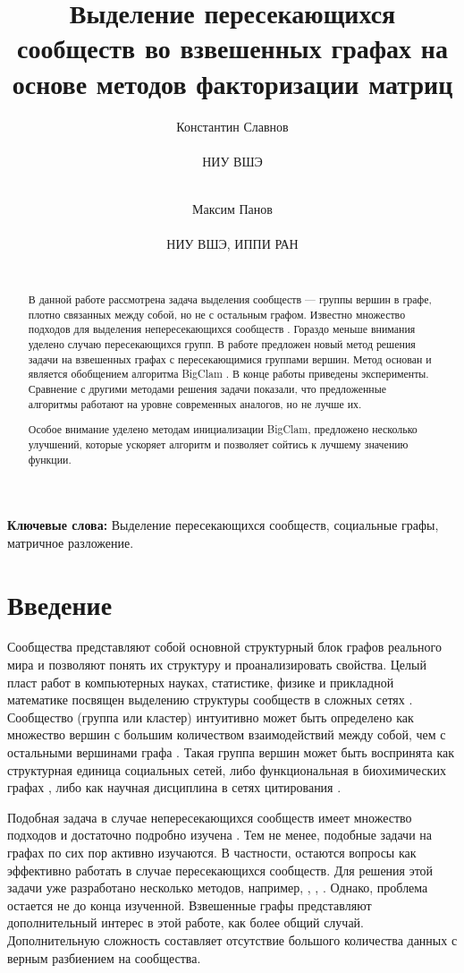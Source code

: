 \documentclass{ITaSconf}
\title{Выделение пересекающихся сообществ во взвешенных графах на основе методов факторизации матриц}
\author{
	Константин Славнов \\
	\begin{affiliation}
		НИУ ВШЭ
	\end{affiliation}\\
	\email{kaslavnov@edu.hse.ru}
	\and
	Максим Панов \\
	\begin{affiliation}
		НИУ ВШЭ, ИППИ РАН
	\end{affiliation}\\
	\email{panov.maxim@gmail.com}
}
\begin{document}
	\maketitle
	
	\begin{abstract}
		В данной работе рассмотрена задача выделения сообществ --- группы вершин в графе, плотно связанных между собой, но не с остальным графом. Известно множество подходов для выделения непересекающихся сообществ \cite{Fortunato10}. Гораздо меньше внимания уделено случаю пересекающихся групп. В работе предложен новый метод решения задачи на взвешенных графах с пересекающимися группами вершин. Метод основан и является обобщением алгоритма BigClam \cite{yang2013overlapping}.
		В конце работы приведены эксперименты. Сравнение с другими методами решения задачи показали, что предложенные алгоритмы работают на уровне современных аналогов, но не лучше их.
		
		Особое внимание уделено методам инициализации BigClam, предложено несколько улучшений, которые ускоряет алгоритм и позволяет сойтись к лучшему значению функции.
	\end{abstract}
	
	\textbf{Ключевые слова:} Выделение пересекающихся сообществ, социальные графы, матричное разложение.
	
	\section{Введение}
	
	Сообщества представляют собой основной структурный блок графов реального мира и позволяют понять их структуру и проанализировать свойства.
	Целый пласт работ в компьютерных науках, статистике, физике и прикладной математике посвящен выделению структуры сообществ в сложных сетях \cite{Fortunato10}. Сообщество (группа или кластер) интуитивно может быть определено как множество вершин с большим количеством взаимодействий между собой, чем с остальными вершинами графа \cite{girvan2002community}. Такая группа вершин может быть воспринята как структурная единица социальных сетей, либо функциональная в биохимических графах \cite{krogan2006global}, либо как научная дисциплина в сетях цитирования \cite{backstrom2006group}. 
	
	Подобная задача в случае непересекающихся сообществ имеет множество подходов и достаточно подробно изучена \cite{Fortunato10}. Тем не менее, подобные задачи на графах по сих пор активно изучаются. В частности, остаются вопросы как эффективно работать в случае пересекающихся сообществ.
	Для решения этой задачи уже разработано несколько методов, например, \cite{airoldi2008mixed}, \cite{palla2005uncovering}, \cite{gregory2010finding}. Однако, проблема остается не до конца изученной. Взвешенные графы представляют дополнительный интерес в этой работе, как более общий случай. Дополнительную сложность составляет отсутствие большого количества данных с верным разбиением на сообщества.
	
\end{document}
